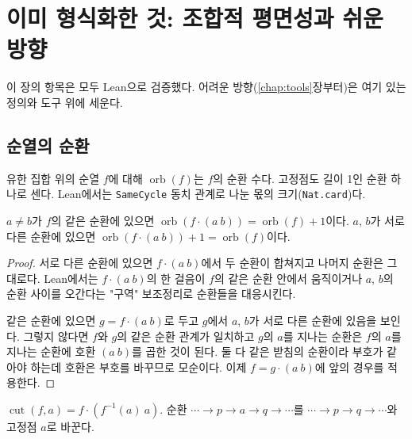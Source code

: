 \chapter{이미 형식화한 것: 조합적 평면성과 쉬운 방향}
\label{chap:easy}

이 장의 항목은 모두 Lean으로 검증했다. 어려운 방향(\ref{chap:tools}장부터)은 여기 있는 정의와
도구 위에 세운다.

\section{순열의 순환}

\begin{definition}[순환 수]
\label{def:orbitCount}
\leanok
유한 집합 위의 순열 \(f\)에 대해 \(\operatorname{orb}(f)\)는 \(f\)의 순환 수다. 고정점도 길이 1인
순환 하나로 센다. Lean에서는 \texttt{SameCycle} 동치 관계로 나눈 몫의 크기(\texttt{Nat.card})다.
\end{definition}

\begin{lemma}
\label{lem:swap}
\leanok
{}
\(a \ne b\)가 \(f\)의 같은 순환에 있으면 \(\operatorname{orb}(f \cdot (a\ b)) = \operatorname{orb}(f) + 1\)이다.
\(a\), \(b\)가 서로 다른 순환에 있으면 \(\operatorname{orb}(f \cdot (a\ b)) + 1 = \operatorname{orb}(f)\)이다.
\end{lemma}

\begin{proof}
\leanok
서로 다른 순환에 있으면 \(f \cdot (a\ b)\)에서 두 순환이 합쳐지고 나머지 순환은 그대로다. Lean에서는
\(f \cdot (a\ b)\)의 한 걸음이 \(f\)의 같은 순환 안에서 움직이거나 \(a\), \(b\)의 순환 사이를 오간다는
"구역" 보조정리로 순환들을 대응시킨다.

같은 순환에 있으면 \(g = f \cdot (a\ b)\)로 두고 \(g\)에서 \(a\), \(b\)가 서로 다른 순환에 있음을 보인다.
그렇지 않다면 \(f\)와 \(g\)의 같은 순환 관계가 일치하고 \(g\)의 \(a\)를 지나는 순환은
\(f\)의 \(a\)를 지나는 순환에 호환 \((a\ b)\)를 곱한 것이 된다. 둘 다 같은 받침의 순환이라 부호가 같아야
하는데 호환은 부호를 바꾸므로 모순이다. 이제 \(f = g \cdot (a\ b)\)에 앞의 경우를 적용한다.
\end{proof}

\begin{definition}[점 하나 잘라 내기]
\label{def:cut}
\leanok
\(\operatorname{cut}(f, a) = f \cdot (f^{-1}(a)\ a)\). 순환 \(\cdots \to p \to a \to q \to \cdots\)를
\(\cdots \to p \to q \to \cdots\)와 고정점 \(a\)로 바꾼다.
\end{definition}

